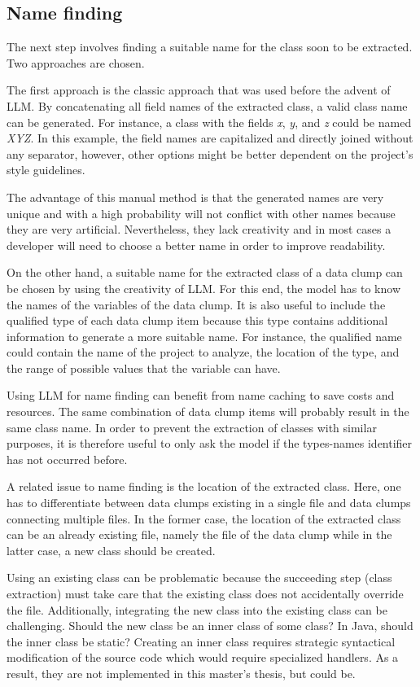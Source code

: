 \subsection{Name finding}
The next step involves finding a suitable name for the class soon to be extracted. Two approaches are chosen.

The first approach is the classic approach that was used before the advent of \acs{LLM}. By concatenating all field names of the extracted class, a valid class name can be generated. For instance, a class with the fields \textit{x}, \textit{y}, and \textit{z} could be named \textit{XYZ}. In this example, the field names are capitalized and directly joined without any separator, however, other options might be better dependent on the project's style guidelines. 

The advantage of this manual method is that the generated names are very unique and with a high probability will not conflict with other names because they are very artificial. Nevertheless, they lack creativity and in most cases a developer will need to choose a better name in order to improve readability. 


On the other hand, a suitable name for the extracted class of a data clump can be chosen by using the creativity of \acs{LLM}.  For this end, the model has to know the names of the variables of the data clump. It is also useful to include the qualified type of each data clump item because this type contains additional information to generate a more suitable name. For instance, the qualified name could contain the name of the project to analyze, the location of the type,     and the range of possible values that the variable can have.

Using \acs{LLM} for name finding can benefit from  name caching to save costs and resources. The same combination of data clump items will probably result in the same class name. In order to prevent the extraction of classes with similar purposes, it is therefore useful to only ask the model if the types-names identifier has not occurred before. 

A related issue to name finding is the location of the extracted class. Here, one has to differentiate  between data clumps existing in a single file and data clumps connecting multiple files. In the former case, the location of the extracted class can be an already existing file, namely the file of the data clump  while in the latter case, a new class should be created.

Using an existing class can be problematic because the succeeding step (class extraction) must take care that the existing class does not accidentally override the file. Additionally, integrating the new class into the existing class can be challenging. Should the new class be an inner class of some class? In Java, should the inner class be static?  Creating an inner class requires strategic syntactical modification of the source code which would require specialized handlers. As a result, they are not implemented in this master's thesis, but could be. 

